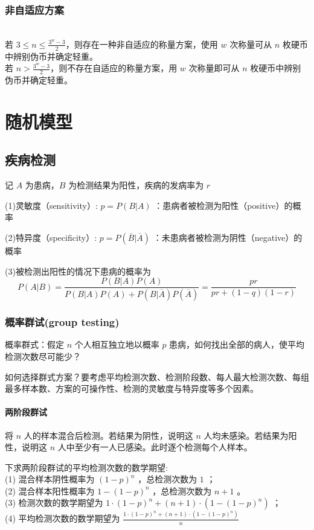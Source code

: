 \documentclass[10t, a4paper, oneside]{ctexbook}
\begin{document}
\subsection{非自适应方案}
\\
若 $3\leq n\leq \frac{3^w-3}{2}$，则存在一种非自适应的称量方案，使用 $w$ 次称量可从 $n$ 枚硬币中辨别伪币并确定轻重。\\
若 $n>\frac{3^w-3}{2}$，则不存在自适应的称量方案，用 $w$ 次称量即可从 $n$ 枚硬币中辨别伪币并确定轻重。\\
\newpage
\chapter{随机模型}
\section{疾病检测}
\noindent{}
记 $A$ 为患病，$B$ 为检测结果为阳性，疾病的发病率为 $r$

(1)灵敏度（sensitivity）: $p=P(B|A)$ ：患病者被检测为阳性（positive）的概率

(2)特异度（specificity）: $p=P(\overline{B}|\overline{A})$ ：未患病者被检测为阴性（negative）的概率

(3)被检测出阳性的情况下患病的概率为
$$
P(A|B)=\frac{P(B|A)P(A)}{P(B|A)P(A)+P(B|\overline{A})P(\overline{A})}=\frac{pr}{pr+(1-q)(1-r)}
$$
\subsection{概率群试(group testing)}
概率群式：假定 $n$ 个人相互独立地以概率 $p$ 患病，如何找出全部的病人，使平均检测次数尽可能少？

如何选择群式方案？要考虑平均检测次数、检测阶段数、每人最大检测次数、每组最多样本数、方案的可操作性、检测的灵敏度与特异度等多个因素。

\subsubsection{两阶段群试}

将 $n$ 人的样本混合后检测。若结果为阴性，说明这 $n$ 人均未感染。若结果为阳性，说明这 $n$ 人中至少有一人已感染。此时逐个检测每个人样本。

下求两阶段群试的平均检测次数的数学期望:\\
(1) 混合样本阴性概率为 $(1-p)^n$ ，总检测次数为 $1$ ；\\
(2) 混合样本阳性概率为 $1-(1-p)^n$ ，总检测次数为 $n+1$ 。\\
(3) 检测次数的数学期望为 $1\cdot(1-p)^n+(n+1)\cdot(1-(1-p)^n)$ ；\\
(4) 平均检测次数的数学期望为 $\frac{1\cdot(1-p)^n+(n+1)\cdot(1-(1-p)^n)}{n}$
\end{document}
